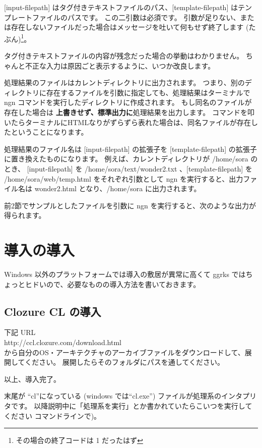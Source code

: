\documentclass[a4j]{jsarticle}
\begin{document}
[input-filepath] はタグ付きテキストファイルのパス、[template-filepath] はテンプレートファイルのパスです。
この二引数は必須です。
引数が足りない、または存在しないファイルだった場合はメッセージを吐いて何もせず終了します (たぶん)\footnote{その場合の終了コードは 1 だったはず}。

タグ付きテキストファイルの内容が残念だった場合の挙動はわかりません。
ちゃんと不正な入力は原因ごと表示するように、いつか改良します。

処理結果のファイルはカレントディレクトリに出力されます。
つまり、別のディレクトリに存在するファイルを引数に指定しても、処理結果はターミナルで ngn コマンドを実行したディレクトリに作成されます。
もし同名のファイルが存在した場合は \textbf{上書きせず、標準出力に}処理結果を出力します。
コマンドを叩いたらターミナルにHTMLなりがずらずら表れた場合は、同名ファイルが存在したということになります。

処理結果のファイル名は [input-filepath] の拡張子を [template-filepath] の拡張子に置き換えたものになります。
例えば、カレントディレクトリが /home/sora のとき、 [input-filepath] を /home/sora/text/wonder2.txt 、[template-filepath] を /home/sora/web/temp.html をそれぞれ引数として ngn を実行すると、出力ファイル名は wonder2.html となり、/home/sora に出力されます。

前2節でサンプルとしたファイルを引数に ngn を実行すると、次のような出力が得られます。




\section{導入の導入}
\label{install-requirements}

Windows 以外のプラットフォームでは導入の敷居が異常に高くて ggrks ではちょっとヒドいので、必要なものの導入方法を書いておきます。

\subsection{Clozure CL の導入}

下記 URL \\
http://ccl.clozure.com/download.html \\
から自分のOS・アーキテクチャのアーカイブファイルをダウンロードして、展開してください。
展開したらそのフォルダにパスを通してください。

以上、導入完了。

末尾が ``cl''になっている (windows では``cl.exe'') ファイルが処理系のインタプリタです。
以降説明中に「処理系を実行」とか書かれていたらこいつを実行してください コマンドラインで)。
\end{document}

